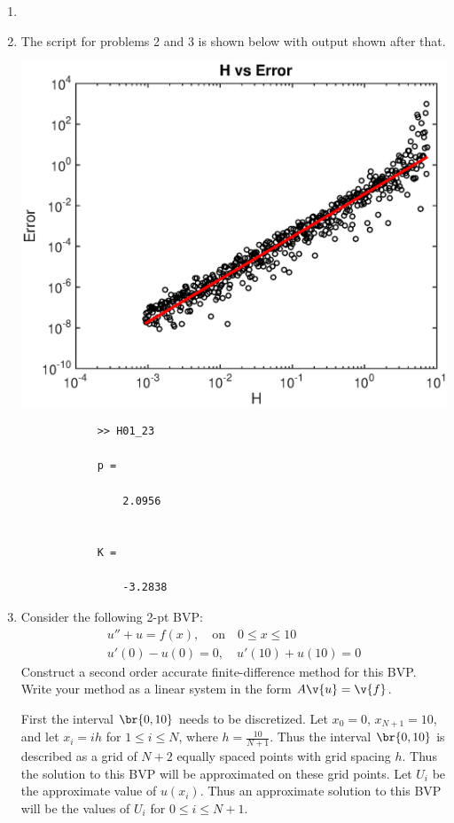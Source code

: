 \documentclass[11pt, oneside]{article}
\begin{document}
\begin{enumerate}
    \item %
    \item %
        The script for problems 2 and 3 is shown below with output shown after that.
        
        \begin{center}
            \includegraphics[scale=.5]{Figures/01_1.eps}
        \end{center}
        \begin{verbatim}
            >> H01_23

            p =

                2.0956


            K =

                -3.2838
        \end{verbatim}

    \item %
        Consider the following 2-pt BVP:
        \begin{align*}
            u'' + u = f(x), \quad \text{on} \quad 0 \le x \le 10 \\
            u'(0) - u(0) = 0, \quad u'(10) + u(10) = 0
        \end{align*}
        Construct a second order accurate finite-difference method for this BVP.
        Write your method as a linear system in the form $A \v{u} = \v{f}$.

        First the interval $\br{0, 10}$ needs to be discretized.
        Let $x_0 = 0$, $x_{N + 1} = 10$, and let $x_{i} = ih$ for $1 \le i \le N$,
        where $h = \frac{10}{N+1}$.
        Thus the interval $\br{0, 10}$ is described as a grid of $N+2$ equally
        spaced points with grid spacing $h$.
        Thus the solution to this BVP will be approximated on these grid points.
        Let $U_i$ be the approximate value of $u(x_i)$.
        Thus an approximate solution to this BVP will be the values of $U_i$ for
        $0 \le i \le N+1$.


\end{enumerate}
\end{document}
